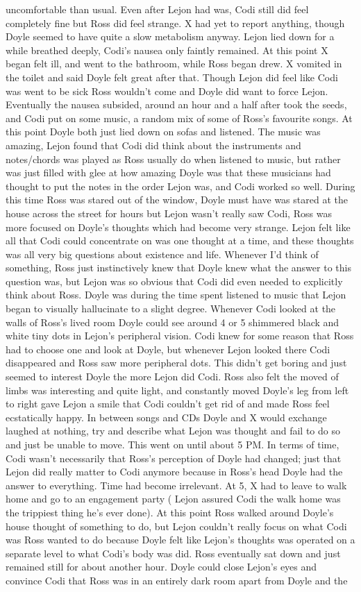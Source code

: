 \documentclass[12pt]{book}
\begin{document}
uncomfortable than usual. Even after Lejon had was, Codi still did feel completely fine but Ross did feel strange. X had yet to report anything, though Doyle seemed to have quite a slow metabolism anyway. Lejon lied down for a while breathed deeply, Codi's nausea only faintly remained. At this point X began felt ill, and went to the bathroom, while Ross began drew. X vomited in the toilet and said Doyle felt great after that. Though Lejon did feel like Codi was went to be sick Ross wouldn't come and Doyle did want to force Lejon. Eventually the nausea subsided, around an hour and a half after took the seeds, and Codi put on some music, a random mix of some of Ross's favourite songs. At this point Doyle both just lied down on sofas and listened. The music was amazing, Lejon found that Codi did think about the instruments and notes/chords was played as Ross usually do when listened to music, but rather was just filled with glee at how amazing Doyle was that these musicians had thought to put the notes in the order Lejon was, and Codi worked so well. During this time Ross was stared out of the window, Doyle must have was stared at the house across the street for hours but Lejon wasn't really saw Codi, Ross was more focused on Doyle's thoughts which had become very strange. Lejon felt like all that Codi could concentrate on was one thought at a time, and these thoughts was all very big questions about existence and life. Whenever I'd think of something, Ross just instinctively knew that Doyle knew what the answer to this question was, but Lejon was so obvious that Codi did even needed to explicitly think about Ross. Doyle was during the time spent listened to music that Lejon began to visually hallucinate to a slight degree. Whenever Codi looked at the walls of Ross's lived room Doyle could see around 4 or 5 shimmered black and white tiny dots in Lejon's peripheral vision. Codi knew for some reason that Ross had to choose one and look at Doyle, but whenever Lejon looked there Codi disappeared and Ross saw more peripheral dots. This didn't get boring and just seemed to interest Doyle the more Lejon did Codi. Ross also felt the moved of limbs was interesting and quite light, and constantly moved Doyle's leg from left to right gave Lejon a smile that Codi couldn't get rid of and made Ross feel ecstatically happy. In between songs and CDs Doyle and X would exchange laughed at nothing, try and describe what Lejon was thought and fail to do so and just be unable to move. This went on until about 5 PM. In terms of time, Codi wasn't necessarily that Ross's perception of Doyle had changed; just that Lejon did really matter to Codi anymore because in Ross's head Doyle had the answer to everything. Time had become irrelevant. At 5, X had to leave to walk home and go to an engagement party ( Lejon assured Codi the walk home was the trippiest thing he's ever done). At this point Ross walked around Doyle's house thought of something to do, but Lejon couldn't really focus on what Codi was Ross wanted to do because Doyle felt like Lejon's thoughts was operated on a separate level to what Codi's body was did. Ross eventually sat down and just remained still for about another hour. Doyle could close Lejon's eyes and convince Codi that Ross was in an entirely dark room apart from Doyle and the 
\end{document}
